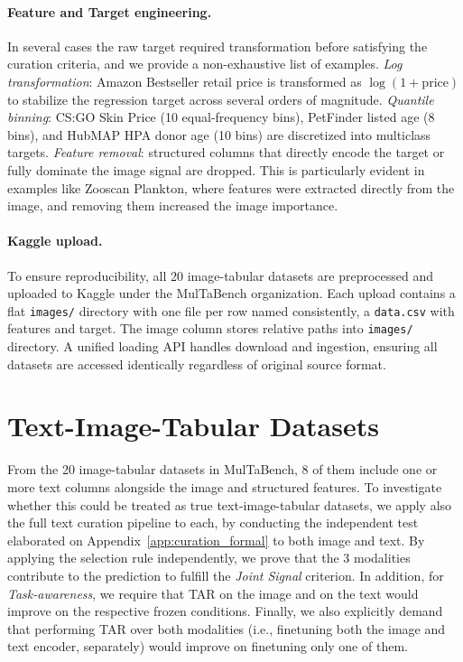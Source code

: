 \paragraph{Feature and Target engineering.}
In several cases the raw target required transformation before satisfying the curation criteria, and we provide a non-exhaustive list of examples. \textit{Log transformation}: Amazon Bestseller retail price is transformed as $\log(1 + \mathrm{price})$ to stabilize the regression target across several orders of magnitude. \textit{Quantile binning}: CS:GO Skin Price (10 equal-frequency bins), PetFinder listed age (8 bins), and HubMAP HPA donor age (10 bins) are discretized into multiclass targets. \textit{Feature removal}: structured columns that directly encode the target or fully dominate the image signal are dropped. This is particularly evident in examples like Zooscan Plankton, where features were extracted directly from the image, and removing them increased the image importance.

\paragraph{Kaggle upload.}
To ensure reproducibility, all 20 image-tabular datasets are preprocessed and uploaded to Kaggle under the MulTaBench organization. Each upload contains a flat \texttt{images/} directory with one file per row named consistently, a \texttt{data.csv} with features and target. The image column stores relative paths into \texttt{images/} directory. A unified loading API handles download and ingestion, ensuring all datasets are accessed identically regardless of original source format.


\section{Text-Image-Tabular Datasets}
\label{app:trimodal_datasets}

From the 20 image-tabular datasets in MulTaBench, 8 of them include one or more text columns alongside the image and structured features. To investigate whether this could be treated as true text-image-tabular datasets, we apply also the full text curation pipeline to each, by conducting the independent test elaborated on Appendix~\ref{app:curation_formal} to both image and text. By applying the selection rule independently, we prove that the 3 modalities contribute to the prediction to fulfill the \textit{Joint Signal} criterion. In addition, for \textit{Task-awareness}, we require that TAR on the image and on the text would improve on the respective frozen conditions. Finally, we also explicitly demand that performing TAR over both modalities (i.e., finetuning both the image and text encoder, separately) would improve on finetuning only one of them.


